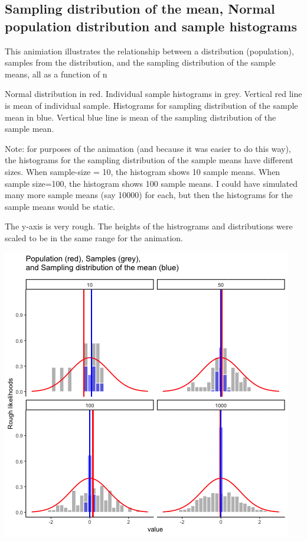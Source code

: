 \documentclass[]{book}
\begin{document}
\hypertarget{sampling-distribution-of-the-mean-normal-population-distribution-and-sample-histograms}{%
\subsection{Sampling distribution of the mean, Normal population distribution and sample histograms}\label{sampling-distribution-of-the-mean-normal-population-distribution-and-sample-histograms}}

This animiation illustrates the relationship between a distribution (population), samples from the distribution, and the sampling distribution of the sample means, all as a function of n

Normal distribution in red. Individual sample histograms in grey. Vertical red line is mean of individual sample. Histograms for sampling distribution of the sample mean in blue. Vertical blue line is mean of the sampling distribution of the sample mean.

Note: for purposes of the animation (and because it was easier to do this way), the histograms for the sampling distribution of the sample means have different sizes. When sample-size = 10, the histogram shows 10 sample means. When sample size=100, the histogram shows 100 sample means. I could have simulated many more sample means (say 10000) for each, but then the histograms for the sample means would be static.

The y-axis is very rough. The heights of the histrograms and distributions were scaled to be in the same range for the animation.

\includegraphics{gifs/sampleDistNormal-1.gif}
\end{document}
